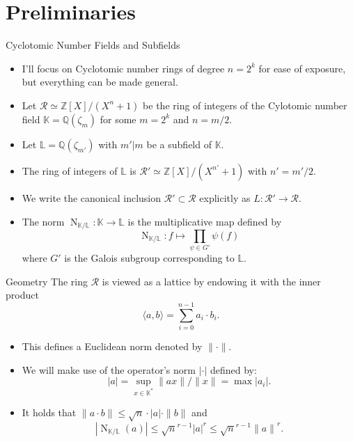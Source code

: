 \documentclass[presentation,smaller]{beamer}
\newcommand{\cR}{\ensuremath{\mathcal{R}}\xspace}
\newcommand{\Z}{\ensuremath{\mathbb Z}\xspace}
\newcommand{\K}{\ensuremath{\mathbb K}\xspace}
\renewcommand{\L}{\ensuremath{\mathbb L}\xspace}
\newcommand{\Q}{\ensuremath{\mathbb Q}\xspace}
\DeclareMathOperator{\Norm}{N}
\begin{document}
\section{Preliminaries}
\label{sec:orgde39ef2}

\begin{frame}[label={sec:orgbf5c306}]{Cyclotomic Number Fields and Subfields}
\begin{itemize}
\item I’ll focus on Cyclotomic number rings of degree \(n = 2^k\) for ease of exposure, but everything can be made general.

\item Let \(\cR ≃ \Z[X]/(X^{n}+1)\) be the ring of integers of the Cylotomic number field \(\K = \Q(ζ_m)\) for some \(m=2^k\) and \(n = m/2\).

\item Let \(\L = \Q(ζ_{m'})\) with \(m' | m\) be a subfield of \(\K\).

\item The ring of integers of \(\L\) is \(\cR' ≃ \Z[X]/(X^{n'} + 1)\) with \(n' = m'/2\).

\item We write the canonical inclusion \(\cR' \subset \cR\) explicitly as \(L : \cR' \rightarrow \cR\).

\item The norm \(\Norm_{\K/\L}: \K \rightarrow \L\) is the multiplicative map defined by \[\Norm_{\K/\L} : f \mapsto  \prod_{\psi \in G'} \psi(f)\] where \(G'\) is the Galois subgroup corresponding to \(\L\).
\end{itemize}
\end{frame}

\begin{frame}[label={sec:org036d3bd}]{Geometry}
The ring \(\cR\) is viewed as a lattice by endowing it with the inner product \[\langle a , b\rangle = \sum_{i=0}^{n-1} a_i ⋅ b_i.\] 

\begin{itemize}
\item This defines a Euclidean norm denoted by \(\| \cdot \|\).

\item We will make use of the operator's norm \(|\cdot|\) defined by: \[|a| = \sup_{x \in \K^*} \|ax\|/\|x\| = \max |a_i|.\]

\item It holds that \(\| a⋅b \| ≤ \sqrt{n} ⋅ |a| ⋅ \| b \|\) and \[|\Norm_{\K/\L}(a)| ≤ \sqrt{n}^{r-1} {|a|}^r ≤ \sqrt{n}^{r-1} {\|a\|}^r.\]
\end{itemize}
\end{frame}
\end{document}
